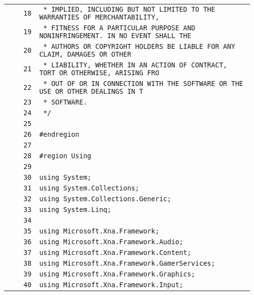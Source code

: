 \documentclass[a4paper,10pt]{article}
\begin{document}
\begin{longtable}[l]{lrrl}
\cellcolor{gray} &  & \verb~18~ & \verb~ * IMPLIED, INCLUDING BUT NOT LIMITED TO THE WARRANTIES OF MERCHANTABILITY,~\\
\cellcolor{gray} &  & \verb~19~ & \verb~ * FITNESS FOR A PARTICULAR PURPOSE AND NONINFRINGEMENT. IN NO EVENT SHALL THE~\\
\cellcolor{gray} &  & \verb~20~ & \verb~ * AUTHORS OR COPYRIGHT HOLDERS BE LIABLE FOR ANY CLAIM, DAMAGES OR OTHER~\\
\cellcolor{gray} &  & \verb~21~ & \verb~ * LIABILITY, WHETHER IN AN ACTION OF CONTRACT, TORT OR OTHERWISE, ARISING FRO~\\
\cellcolor{gray} &  & \verb~22~ & \verb~ * OUT OF OR IN CONNECTION WITH THE SOFTWARE OR THE USE OR OTHER DEALINGS IN T~\\
\cellcolor{gray} &  & \verb~23~ & \verb~ * SOFTWARE.~\\
\cellcolor{gray} &  & \verb~24~ & \verb~ */~\\
\cellcolor{gray} &  & \verb~25~ & \verb~~\\
\cellcolor{gray} &  & \verb~26~ & \verb~#endregion~\\
\cellcolor{gray} &  & \verb~27~ & \verb~~\\
\cellcolor{gray} &  & \verb~28~ & \verb~#region Using~\\
\cellcolor{gray} &  & \verb~29~ & \verb~~\\
\cellcolor{gray} &  & \verb~30~ & \verb~using System;~\\
\cellcolor{gray} &  & \verb~31~ & \verb~using System.Collections;~\\
\cellcolor{gray} &  & \verb~32~ & \verb~using System.Collections.Generic;~\\
\cellcolor{gray} &  & \verb~33~ & \verb~using System.Linq;~\\
\cellcolor{gray} &  & \verb~34~ & \verb~~\\
\cellcolor{gray} &  & \verb~35~ & \verb~using Microsoft.Xna.Framework;~\\
\cellcolor{gray} &  & \verb~36~ & \verb~using Microsoft.Xna.Framework.Audio;~\\
\cellcolor{gray} &  & \verb~37~ & \verb~using Microsoft.Xna.Framework.Content;~\\
\cellcolor{gray} &  & \verb~38~ & \verb~using Microsoft.Xna.Framework.GamerServices;~\\
\cellcolor{gray} &  & \verb~39~ & \verb~using Microsoft.Xna.Framework.Graphics;~\\
\cellcolor{gray} &  & \verb~40~ & \verb~using Microsoft.Xna.Framework.Input;~\\

\end{longtable}
\end{document}

